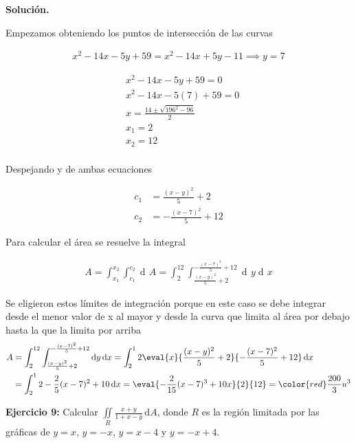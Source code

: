 \documentclass[12pt]{article}
\DeclareMathOperator{\di}{d\!}
\begin{document}
\vspace{5mm}

\noindent \textbf{Solución.}
 
\vspace{5mm}

Empezamos obteniendo los puntos de intersección de las curvas

\begin{align*}
	x^2 -14x -5y +59 = x^2-14x+5y-11 \implies y = 7
\end{align*}

\begin{align*}
	&x^2 -14x -5y +59 = 0 \\
	&x^2 -14x -5(7) +59 = 0 \\
	&x = \frac{14 \pm \sqrt{196^2-96 }}{2} \\
	&x_1 = 2 \\
	&x_2 = 12 \\
\end{align*}

Despejando y de ambas ecuaciones

\begin{align*}
	c_1 &= \frac{(x-y)^2}{5} + 2 \\
	c_2 &= -\frac{(x-7)^2}{5}+12
\end{align*}

Para calcular el área se resuelve la integral 

\begin{align*}
	A = \int_{x_1}^{x_2} \int_{c_1}^{c_2} \di A = \int_{2}^{12} \int_{\frac{(x-y)^2}{5} + 2}^{-\frac{(x-7)^2}{5}+12} \di y \di x
\end{align*}

Se eligieron estos límites de integración porque en este caso se debe integrar desde el menor
valor de x al mayor y desde la curva que limita al área por debajo hasta la que la limita
por arriba
\begin{align*}
A &= \int_{2}^{12} \int_{\frac{(x-y)^2}{5} + 2}^{-\frac{(x-7)^2}{5}+12} \di y \di x 
= \int_2^12 \eval{x}{\frac{(x-y)^2}{5} + 2}{-\frac{(x-7)^2}{5}+12} \di x \\
&= \int_2^12 -\frac{2}{5}(x-7)^2+10 \di x = \eval{-\frac{2}{15}(x-7)^3+10x}{2}{12}
=\color{red}\frac{200}{3} u^3 
\end{align*}

\noindent \textbf{Ejercicio 9:} Calcular $\iint\limits_R \frac{x+y}{1+x-y}\, \mathrm{d}A$, donde $R$ es la región limitada por las gráficas de $y=x$, $y=-x$, $y=x-4$ y $y=-x+4$.
\end{document}
